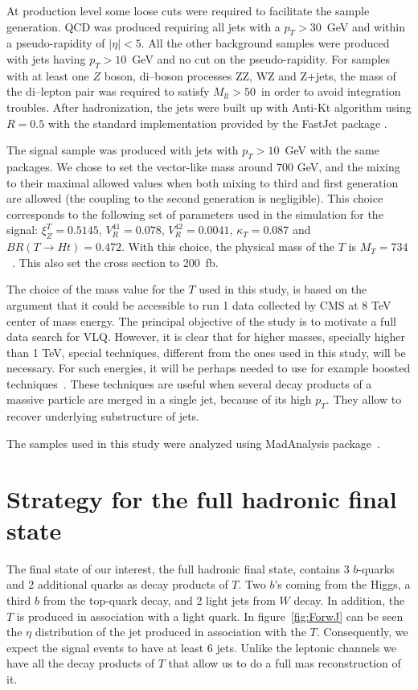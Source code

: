 At production level some loose cuts were required to facilitate the sample generation. QCD was produced requiring all jets with a $p_{T}>30$~GeV and within a pseudo-rapidity of $|\eta|<5$. All the other background samples were produced with jets having $p_{T}>10$~GeV and no cut on the pseudo-rapidity. For samples with at least one $Z$ boson, di--boson processes ZZ, WZ and Z+jets, the mass of the di--lepton pair was required to satisfy $M_{ll}>50$~\GeVcc in order to avoid integration troubles. After hadronization, the jets were built up with Anti-Kt algorithm using $R=0.5$ with the standard implementation provided by the FastJet package \cite{Cacciari:2011ma}.

The signal sample was produced with jets with $p_{T}>10$~GeV with the same packages. We chose to set the vector-like mass around 700 GeV, and the mixing to their maximal allowed values when both mixing to third and first generation are allowed (the coupling to the second generation is negligible). This choice corresponds to the following set of parameters used in the simulation for the signal: $\xi_Z^{T}=0.5145$, $V_{R}^{41}=0.078$, $V_{R}^{42}=0.0041$, $\kappa_{T}=0.087$ and $BR(T \to H t)=0.472$. With this choice, the physical mass of the $T$ is $M_{T}=734$~\GeVcc. This also set the cross section to 200~fb. 

The choice of the mass value for the $T$ used in this study, is based on the argument that it could be accessible to run 1 data collected by CMS at 8 TeV center of mass energy. The principal objective of the study is to motivate a full data search for VLQ. However, it is clear that for higher masses, specially higher than 1 TeV, special techniques, different from the ones used in this study, will be necessary. For such energies, it will be perhaps needed to use for example boosted techniques~\cite{CMS:2013vca, ATLAS-CONF-2013-084, Usai:2015vva}. These techniques are useful when several decay products of a massive particle are merged in a single jet, because of its high $p_{T}$. They allow to recover underlying substructure of jets. 

The samples used in this study were analyzed using MadAnalysis package~\cite{Conte:2012fm, Conte:2014zja}.

\section{Strategy for the full hadronic final state}
\label{sec:Pstra}

The final state of our interest, the full hadronic final state, contains 3 $b$-quarks and 2 additional quarks as decay products of $T$. Two $b$'s coming from the Higgs, a third $b$ from the top-quark decay, and 2 light jets from $W$ decay. In addition, the $T$ is produced in association with a light quark. In figure~\ref{fig:ForwJ} can be seen the $\eta$ distribution of the jet produced in association with the $T$. Consequently, we expect the signal events to have at least 6 jets. Unlike the leptonic channels we have all the decay products of $T$ that allow us to do a full mas reconstruction of it.

